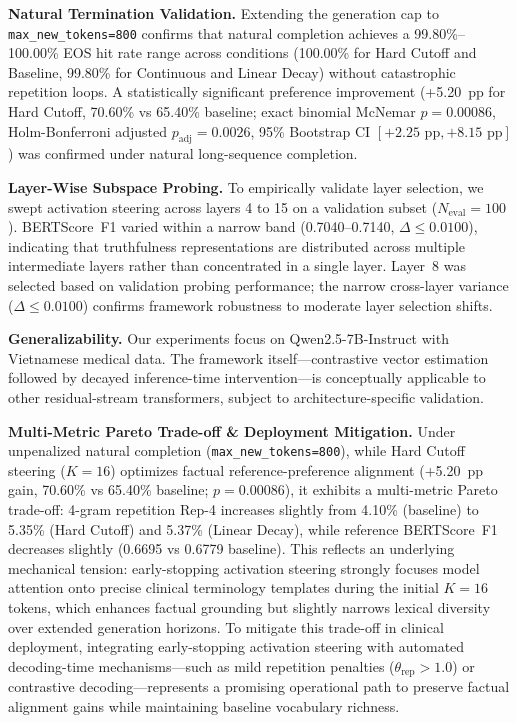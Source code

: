 \documentclass[conference]{IEEEtran}
\begin{document}
\textbf{Natural Termination Validation.} Extending the generation cap to \texttt{max\_new\_tokens=800} confirms that natural completion achieves a 99.80\%--100.00\% EOS hit rate range across conditions (100.00\% for Hard Cutoff and Baseline, 99.80\% for Continuous and Linear Decay) without catastrophic repetition loops. A statistically significant preference improvement (+5.20~pp for Hard Cutoff, 70.60\% vs 65.40\% baseline; exact binomial McNemar $p=0.00086$, Holm-Bonferroni adjusted $p_{\text{adj}}=0.0026$, 95\% Bootstrap CI $[+2.25\text{ pp}, +8.15\text{ pp}]$) was confirmed under natural long-sequence completion.

\textbf{Layer-Wise Subspace Probing.} To empirically validate layer selection, we swept activation steering across layers 4 to 15 on a validation subset ($N_{\text{eval}}=100$). BERTScore~F1 varied within a narrow band (0.7040--0.7140, $\Delta \le 0.0100$), indicating that truthfulness representations are distributed across multiple intermediate layers rather than concentrated in a single layer. Layer~8 was selected based on validation probing performance; the narrow cross-layer variance ($\Delta \le 0.0100$) confirms framework robustness to moderate layer selection shifts.

\textbf{Generalizability.} Our experiments focus on Qwen2.5-7B-Instruct \cite{ref4} with Vietnamese medical data. The framework itself---contrastive vector estimation followed by decayed inference-time intervention---is conceptually applicable to other residual-stream transformers, subject to architecture-specific validation.



\textbf{Multi-Metric Pareto Trade-off \& Deployment Mitigation.} Under unpenalized natural completion (\texttt{max\_new\_tokens=800}), while Hard Cutoff steering ($K=16$) optimizes factual reference-preference alignment (+5.20~pp gain, 70.60\% vs 65.40\% baseline; $p=0.00086$), it exhibits a multi-metric Pareto trade-off: 4-gram repetition Rep-4 increases slightly from 4.10\% (baseline) to 5.35\% (Hard Cutoff) and 5.37\% (Linear Decay), while reference BERTScore~F1 decreases slightly (0.6695 vs 0.6779 baseline). This reflects an underlying mechanical tension: early-stopping activation steering strongly focuses model attention onto precise clinical terminology templates during the initial $K=16$ tokens, which enhances factual grounding but slightly narrows lexical diversity over extended generation horizons. To mitigate this trade-off in clinical deployment, integrating early-stopping activation steering with automated decoding-time mechanisms---such as mild repetition penalties ($\theta_{\text{rep}} > 1.0$) or contrastive decoding---represents a promising operational path to preserve factual alignment gains while maintaining baseline vocabulary richness.
\end{document}
